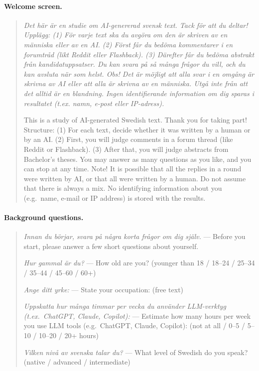 \documentclass[thesis]{cluu}
\begin{document}
\paragraph{Welcome screen.}
\begin{quote}\small
\textit{Det här är en studie om AI-genererad svensk text. Tack för att du deltar!
Upplägg: (1) För varje text ska du avgöra om den är skriven av en människa eller av en AI. (2) Först får du bedöma kommentarer i en forumtråd (likt Reddit eller Flashback). (3) Därefter får du bedöma abstrakt från kandidatuppsatser.
Du kan svara på så många frågor du vill, och du kan avsluta när som helst.
Obs! Det är möjligt att alla svar i en omgång är skrivna av AI eller att alla är skrivna av en människa. Utgå inte från att det alltid är en blandning.
Ingen identifierande information om dig sparas i resultatet (t.ex. namn, e-post eller IP-adress).}

This is a study of AI-generated Swedish text. Thank you for taking part!
Structure: (1) For each text, decide whether it was written by a human or by an AI. (2) First, you will judge comments in a forum thread (like Reddit or Flashback). (3) After that, you will judge abstracts from Bachelor's theses.
You may answer as many questions as you like, and you can stop at any time.
Note! It is possible that all the replies in a round were written by AI, or that all were written by a human. Do not assume that there is always a mix.
No identifying information about you (e.g.\ name, e-mail or IP address) is stored with the results.
\end{quote}

\paragraph{Background questions.}
\begin{quote}\small
\textit{Innan du börjar, svara på några korta frågor om dig själv.} --- Before you start, please answer a few short questions about yourself.

\textit{Hur gammal är du?} --- How old are you? (younger than 18 / 18--24 / 25--34 / 35--44 / 45--60 / 60+)

\textit{Ange ditt yrke:} --- State your occupation: (free text)

\textit{Uppskatta hur många timmar per vecka du använder LLM-verktyg (t.ex.\ ChatGPT, Claude, Copilot):} --- Estimate how many hours per week you use LLM tools (e.g.\ ChatGPT, Claude, Copilot): (not at all / 0--5 / 5--10 / 10--20 / 20+ hours)

\textit{Vilken nivå av svenska talar du?} --- What level of Swedish do you speak? (native / advanced / intermediate)
\end{quote}
\end{document}
